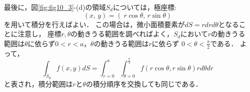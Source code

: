 \documentclass[10pt,a4j]{jbook}
\begin{document}
最後に，図\ref{fig:fig10_3}-(d)の領域$S_d$については，極座標:
\begin{equation}
	\left(x,\,y\right) = \left(\ r\cos\theta,\, r\sin\theta \right)
	\label{eqn:cart2pol}
\end{equation}
を用いて積分を行えばよい．
この場合は，微小面積要素が$dS=r dr d\theta $となることに注意し，
座標$r,\theta$の動きうる範囲を調べればよく，$S_d$において$r$の動きうる
範囲は$\theta$に依らず$0<r<a$，$\theta$の動きうる範囲は$r$に依らず
$0<\theta<\frac{\pi}{2}$である．
よって，
\begin{equation}
	\int_{S_d} f(x,y) dS
	=
	\int_{r=0}^a \int_{\theta=0}^{\frac{\pi}{2}} f(r\cos\theta,r\sin\theta)rd\theta dr
	\label{eqn:int_pol}
\end{equation}
と表され，積分範囲は$r$と$\theta$の積分順序を交換しても同じである．
\end{document}
